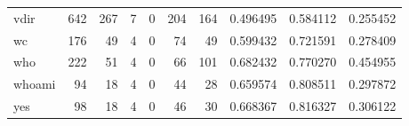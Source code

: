 \begin{tabular}{lrrrrrrrrr}
vdir      &                                                642 &                                                267 &                                                  7 &                                                  0 &                                                204 &                                                164 &                                           0.496495 &                               0.584112 &                             0.255452 \\
wc        &                                                176 &                                                 49 &                                                  4 &                                                  0 &                                                 74 &                                                 49 &                                           0.599432 &                               0.721591 &                             0.278409 \\
who       &                                                222 &                                                 51 &                                                  4 &                                                  0 &                                                 66 &                                                101 &                                           0.682432 &                               0.770270 &                             0.454955 \\
whoami    &                                                 94 &                                                 18 &                                                  4 &                                                  0 &                                                 44 &                                                 28 &                                           0.659574 &                               0.808511 &                             0.297872 \\
yes       &                                                 98 &                                                 18 &                                                  4 &                                                  0 &                                                 46 &                                                 30 &                                           0.668367 &                               0.816327 &                             0.306122 \\
\bottomrule
\end{tabular}
